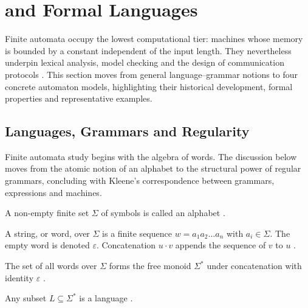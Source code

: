 \section{ and Formal Languages}\label{sec:cfa-languages}

Finite automata occupy the lowest computational tier: machines whose
memory is bounded by a constant independent of the input length.  They
nevertheless underpin lexical analysis, model checking and the design
of communication protocols
\cite{AhoHopcroftUllman1974,Sipser2012}.  This section moves from
general language–grammar notions to four concrete automaton models,
highlighting their historical development, formal properties and
representative examples.

\subsection{Languages, Grammars and Regularity}\label{subsec:foundations}

Finite automata study begins with the algebra of words.  The discussion
below moves from the atomic notion of an alphabet to the structural
power of regular grammars, concluding with Kleene’s correspondence
between grammars, expressions and machines.

\begin{definition}[Alphabet]\label{def:alphabet}
A non-empty finite set $\Sigma$ of symbols is called an alphabet
\cite{HopcroftUllman1979}.
\end{definition}

\begin{definition}\label{def:string}
A string, or word, over $\Sigma$ is a finite sequence
$w=a_{1}a_{2}\dots a_{n}$ with $a_{i}\in\Sigma$.  
The empty word is denoted $\varepsilon$.  
Concatenation $u\cdot v$ appends the sequence of $v$ to $u$
\cite{HopcroftUllman1979}.
\end{definition}

\begin{notation}
The set of all words over $\Sigma$ forms the free monoid
$\Sigma^{\ast}$ under concatenation with identity $\varepsilon$
\cite{HopcroftUllman1979}.
\end{notation}

\begin{definition}\label{def:language}
Any subset $L\subseteq\Sigma^{\ast}$ is a language
\cite{HopcroftUllman1979}.
\end{definition}

